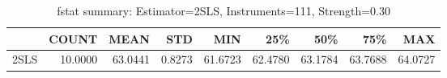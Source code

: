 \begin{table}[ht]
\centering
\caption{fstat summary: Estimator=2SLS, Instruments=111, Strength=0.30}
\begin{tabular}{lrrrrrrrr}
\toprule
 & COUNT & MEAN & STD & MIN & 25\% & 50\% & 75\% & MAX \\
\midrule
2SLS & 10.0000 & 63.0441 & 0.8273 & 61.6723 & 62.4780 & 63.1784 & 63.7688 & 64.0727 \\
\bottomrule
\end{tabular}
\end{table}
